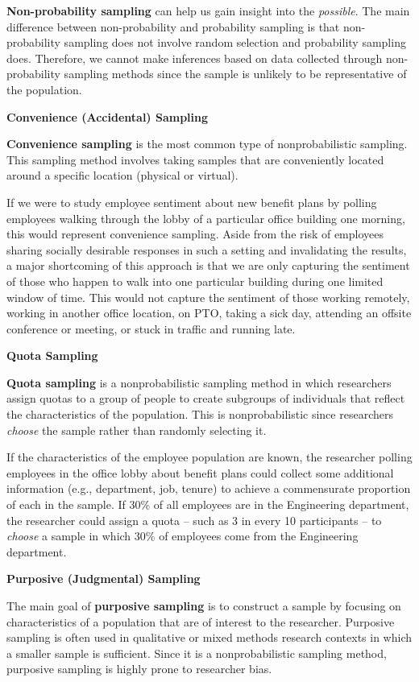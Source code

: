 \documentclass[
]{book}
\begin{document}
\textbf{Non-probability sampling} can help us gain insight into the \emph{possible}. The main difference between non-probability and probability sampling is that non-probability sampling does not involve random selection and probability sampling does. Therefore, we cannot make inferences based on data collected through non-probability sampling methods since the sample is unlikely to be representative of the population.

\textbf{Convenience (Accidental) Sampling}

\textbf{Convenience sampling} is the most common type of nonprobabilistic sampling. This sampling method involves taking samples that are conveniently located around a specific location (physical or virtual).

If we were to study employee sentiment about new benefit plans by polling employees walking through the lobby of a particular office building one morning, this would represent convenience sampling. Aside from the risk of employees sharing socially desirable responses in such a setting and invalidating the results, a major shortcoming of this approach is that we are only capturing the sentiment of those who happen to walk into one particular building during one limited window of time. This would not capture the sentiment of those working remotely, working in another office location, on PTO, taking a sick day, attending an offsite conference or meeting, or stuck in traffic and running late.

\textbf{Quota Sampling}

\textbf{Quota sampling} is a nonprobabilistic sampling method in which researchers assign quotas to a group of people to create subgroups of individuals that reflect the characteristics of the population. This is nonprobabilistic since researchers \emph{choose} the sample rather than randomly selecting it.

If the characteristics of the employee population are known, the researcher polling employees in the office lobby about benefit plans could collect some additional information (e.g., department, job, tenure) to achieve a commensurate proportion of each in the sample. If 30\% of all employees are in the Engineering department, the researcher could assign a quota -- such as 3 in every 10 participants -- to \emph{choose} a sample in which 30\% of employees come from the Engineering department.

\textbf{Purposive (Judgmental) Sampling}

The main goal of \textbf{purposive sampling} is to construct a sample by focusing on characteristics of a population that are of interest to the researcher. Purposive sampling is often used in qualitative or mixed methods research contexts in which a smaller sample is sufficient. Since it is a nonprobabilistic sampling method, purposive sampling is highly prone to researcher bias.
\end{document}
